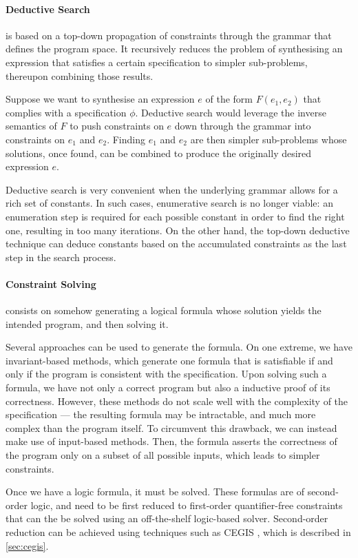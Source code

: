 \paragraph{Deductive Search} \cite{DBLP:conf/oopsla/PolozovG15,DBLP:conf/ijcai/MannaW79,DBLP:conf/cav/ChenWBDF20} is based on a top-down propagation of constraints through the grammar that defines the program space. It recursively reduces the problem of synthesising an expression that satisfies a certain specification to simpler sub-problems, thereupon combining those results.

Suppose we want to synthesise an expression \(e\) of the form \(F(e_1, e_2)\) that complies with a specification \(\phi\). Deductive search would leverage the inverse semantics of \(F\) to push constraints on \(e\) down through the grammar into constraints on \(e_1\) and \(e_2\). Finding \(e_1\) and \(e_2\) are then simpler sub-problems whose solutions, once found, can be combined to produce the originally desired expression \(e\).

Deductive search is very convenient when the underlying grammar allows for a rich set of constants. In such cases, enumerative search is no longer viable: an enumeration step is required for each possible constant in order to find the right one, resulting in too many iterations. On the other hand, the top-down deductive technique can deduce constants based on the accumulated constraints as the last  step in the search process.

\paragraph{Constraint Solving} \cite{Solar-LezamaPhDThesis,DBLP:conf/popl/SrivastavaGF10} consists on somehow generating a logical formula whose solution yields the intended program, and then solving it.

Several approaches can be used to generate the formula. On one extreme, we have invariant-based methods, which generate one formula that is satisfiable if and only if the program is consistent with the specification. Upon solving such a formula, we have not only a correct program but also a inductive proof of its correctness.
However, these methods do not scale well with the complexity of the specification --- the resulting formula may be intractable, and much more complex than the program itself.
%
To circumvent this drawback, we can instead make use of input-based methods. Then, the formula asserts the correctness of the program only on a subset of all possible inputs, which leads to simpler constraints.

Once we have a logic formula, it must be solved. These formulas are of second-order logic, and need to be first reduced to first-order quantifier-free constraints that can the be solved using an off-the-shelf logic-based solver. Second-order reduction can be achieved using techniques such as \ac{CEGIS} \cite{Solar-LezamaPhDThesis,DBLP:conf/tacas/AhmedPA20}, which is described in \autoref{sec:cegis}.

